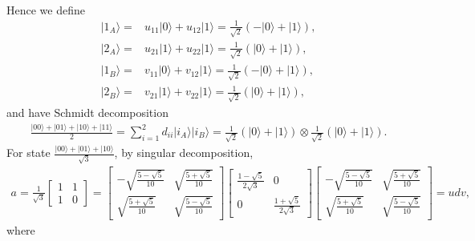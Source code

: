 \documentclass[en]{sol-man}
\begin{document}
\begin{pf}
\begin{align}
    \end{align}
    Hence we define
    \begin{align}
        \lvert 1_A\rangle=&u_{11}\lvert 0\rangle+u_{12}\lvert 1\rangle=\frac{1}{\sqrt{2}}(-\lvert 0\rangle+\lvert 1\rangle),\\
        \lvert 2_A\rangle=&u_{21}\lvert 1\rangle+u_{22}\lvert 1\rangle=\frac{1}{\sqrt{2}}(\lvert 0\rangle+\lvert 1\rangle),\\
        \lvert 1_B\rangle=&v_{11}\lvert 0\rangle+v_{12}\lvert 1\rangle=\frac{1}{\sqrt{2}}(-\lvert 0\rangle+\lvert 1\rangle),\\
        \lvert 2_B\rangle=&v_{21}\lvert 1\rangle+v_{22}\lvert 1\rangle=\frac{1}{\sqrt{2}}(\lvert 0\rangle+\lvert 1\rangle),
    \end{align}
    and have Schmidt decomposition
    \begin{align}
        \frac{\lvert 00\rangle+\lvert 01\rangle+\lvert 10\rangle+\lvert 11\rangle}{2}=\sum_{i=1}^2d_{ii}\lvert i_A\rangle\lvert i_B\rangle=\frac{1}{\sqrt{2}}(\lvert 0\rangle+\lvert 1\rangle)\otimes\frac{1}{\sqrt{2}}(\lvert 0\rangle+\lvert 1\rangle).
    \end{align}
    For state $\frac{\lvert 00\rangle+\lvert 01\rangle+\lvert 10\rangle}{\sqrt{3}}$, by singular decomposition,
    \begin{align}
        a=\frac{1}{\sqrt{3}}\left[\begin{matrix}
            1&1\\
            1&0
        \end{matrix}\right]=\left[\begin{matrix}
            -\sqrt{\frac{5-\sqrt{5}}{10}}&\sqrt{\frac{5+\sqrt{5}}{10}}\\
            \sqrt{\frac{5+\sqrt{5}}{10}}&\sqrt{\frac{5-\sqrt{5}}{10}}
        \end{matrix}\right]\left[\begin{matrix}
            \frac{1-\sqrt{5}}{2\sqrt{3}}&0\\
            0&\frac{1+\sqrt{5}}{2\sqrt{3}}
        \end{matrix}\right]\left[\begin{matrix}
            -\sqrt{\frac{5-\sqrt{5}}{10}}&\sqrt{\frac{5+\sqrt{5}}{10}}\\
            \sqrt{\frac{5+\sqrt{5}}{10}}&\sqrt{\frac{5-\sqrt{5}}{10}}
        \end{matrix}\right]=udv,
    \end{align}
    where
    \begin{align}

\end{align}
\end{pf}
\end{document}
